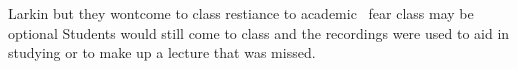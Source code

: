 \documentclass[sigconf]{acmart}
\begin{document}
%
%
%



Larkin but they wontcome to class restiance to academic \
fear class may be optional
Students would still come to class and the recordings were used to aid in studying or to make up a lecture that was missed.




\end{document}
